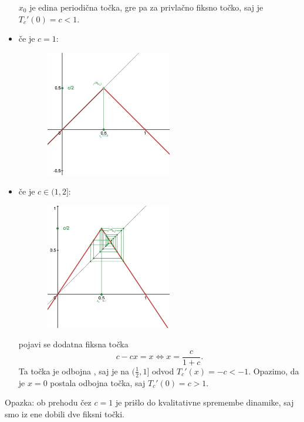 \documentclass{article}
\begin{document}
\begin{itemize}
$x_0$ je edina periodična točka, gre pa za privlačno fiksno točko, saj je $T_c'(0) = c < 1$.
\item če je $c = 1$: 
\begin{figure}[h!]
    \begin{center}
        \includegraphics[width=6cm, height=5.5cm]{Grafi/cobweb142.png}
    \end{center}
\end{figure}
\newpage
\item če je $c\in (1, 2]$: 
\begin{figure}[h!]
    \begin{center}
        \includegraphics[width=6cm, height=5.5cm]{Grafi/cobweb143.png}
    \end{center}
\end{figure}

pojavi se dodatna fiksna točka 
$$
c - cx = x \iff x = \frac{c}{1 + c}.
$$
Ta točka je odbojna , saj je na $(\frac{1}{2}, 1]$ odvod $T_c'(x) = -c < -1$. 
Opazimo, da je $x = 0$ postala odbojna točka, saj $T_c'(0) = c > 1$.
\end{itemize}
\noindent
Opazka: ob prehodu čez $c=1$ je prišlo do kvalitativne spremembe dinamike, saj 
smo iz ene dobili dve fiksni točki.
\end{document}
